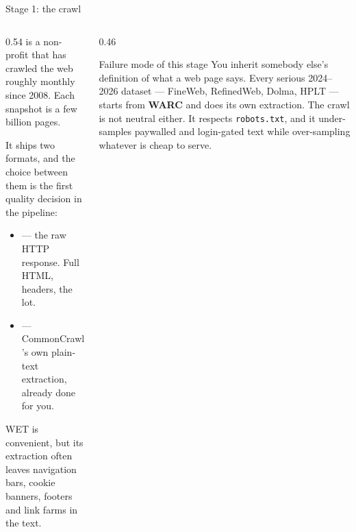 \documentclass[aspectratio=169,10pt]{beamer}
\begin{document}
\begin{frame}{Stage 1: the crawl}
  \begin{columns}[T]
    \begin{column}{0.54\textwidth}
       is a non-profit that has crawled the web roughly
      monthly since 2008. Each snapshot is a few billion pages.
      \vspace{0.5em}

      It ships two formats, and the choice between them is the first quality
      decision in the pipeline:
      \begin{itemize}
        \item {} --- the raw HTTP response. Full HTML, headers, the lot.
        \item {} --- CommonCrawl's own plain-text extraction, already done
          for you.
      \end{itemize}
      \vspace{0.5em}
      WET is convenient, but its extraction often leaves navigation bars,
      cookie banners, footers and link farms in the text.
    \end{column}
    \begin{column}{0.46\textwidth}
      \begin{block}{Failure mode of this stage}
        \small
        You inherit somebody else's definition of what a web page says.
        \vspace{0.4em}
        Every serious 2024--2026 dataset --- FineWeb, RefinedWeb,
        Dolma, HPLT --- starts from \textbf{WARC} and does its own extraction.
        \vspace{0.4em}
        The crawl is not neutral either. It respects \texttt{robots.txt}, and
        it under-samples paywalled and login-gated text while over-sampling
        whatever is cheap to serve.
      \end{block}
    \end{column}
  \end{columns}
\end{frame}
\end{document}
